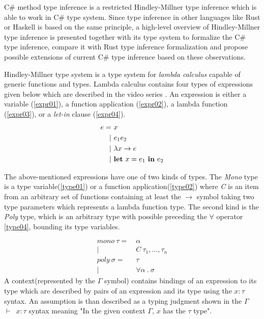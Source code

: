 C\# method type inference is a restricted Hindley-Millner type inference which is able to work in C\# type system.
Since type inference in other languages like Rust or Haskell is based on the same principle, a high-level overview of Hindley-Millner type inference is presented together with its type system to formalize the C\# type inference, compare it with Rust type inference formalization and propose possible extensions of current C\# type inference based on these observations.
\par
Hindley-Millner type system \cite{online:wikiHM} is a type system for \textit{lambda calculus} capable of generic functions and types.
Lambda calculus contains four types of expressions given below which are described in the video series \cite{online:HMVideos}.
An expression is either a variable (\ref{expr01}), a function application (\ref{expr02}), a lambda function (\ref{expr03}), or a \textit{let-in} clause (\ref{expr04}).
\begin{align}
e =&\ x\label{expr01}\\
|&\ e_1 e_2\label{expr02}\\
|&\ \lambda x \rightarrow e\label{expr03}\\
|&\ \text{\textbf{let}}\ x = e_1\ \text{\textbf{in}}\ e_2\label{expr04} 
\end{align}
\par
The above-mentioned expressions have one of two kinds of types.
The \textit{Mono} type is a type variable(\ref{type01}) or a function application(\ref{type02}) where \textit{C} is an item from an arbitrary set of functions containing at least the \texttt{$\rightarrow$} symbol taking two type parameters which represents a lambda function type.
The second kind is the \textit{Poly} type, which is an arbitrary type with possible preceding the $\forall$ operator \ref{type04}, bounding its type variables.
\par
\begin{align}
mono\ \tau =&\ \alpha\label{type01}\\
|&\ C\ \tau_1,...,\tau_n\label{type02}\\
poly\ \sigma =&\ \tau\label{type03}\\
|&\ \forall \alpha\ .\ \sigma\label{type04}
\end{align}
A context(represented by the \texttt{$\Gamma$} symbol) contains bindings of an expression to its type which are described by pairs of an expression and its type using the \texttt{$x:\tau$} syntax.
An assumption is than described as a typing judgment shown in the \texttt{$\Gamma$ $\vdash$ $x:\tau$} syntax meaning "In the given context \texttt{$\Gamma$}, \texttt{$x$} has the \texttt{$\tau$} type".

